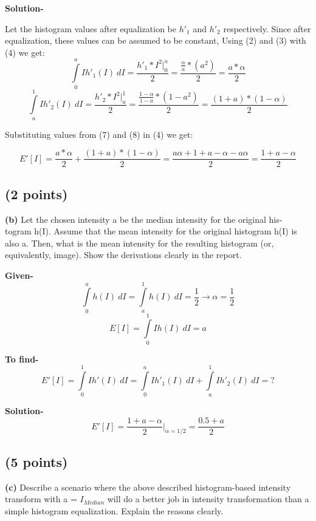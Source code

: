 \documentclass{article}
\begin{document}
\textbf{Solution-}

Let the histogram values after equalization be $h'_1$ and $h'_2$ respectively. Since after equalization, these values can be assumed to be constant,
Using (2) and (3) with (4) we get:
\begin{equation} \int\limits_0^a I h'_1(I) \ dI =\frac{h'_1 * I^2|_0^a}{2}=\frac{\frac{\alpha}{a}*(a^2)}{2}  = \frac{a*\alpha}{2}\end{equation}
\begin{equation} \int\limits_a^1 I h'_2(I) \ dI =\frac{h'_2 * I^2|_a^1}{2}=\frac{\frac{1-\alpha}{1-a}*(1-a^2)}{2}= \frac{(1+a)*(1-\alpha)}{2}\end{equation}

Substituting values from (7) and (8) in (4) we get:

\begin{equation}E'[I] = \frac{a*\alpha}{2}+\frac{(1+a)*(1-\alpha)}{2}=\frac{a\alpha+1+a-\alpha-a\alpha}{2}=\frac{1+a-\alpha}{2}\end{equation}
\subsection{(2 points)}
\textbf{(b)} Let the chosen intensity a be the median intensity for the original his-
togram h(I). Assume that the mean intensity for the original histogram h(I)
is also a. Then, what is the mean intensity for the resulting histogram (or,
equivalently, image). Show the derivations clearly in the report.

\textbf{Given-}
\begin{equation}\int\limits_0^a h(I) \ dI =\int\limits_a^1 h(I) \ dI = \frac{1}{2} \rightarrow \alpha = \frac{1}{2}\end{equation}
\begin{equation}E[I] = \int\limits_0^1 I h(I) \ dI =a\end{equation}

\textbf{To find-}
\begin{equation}E'[I] = \int\limits_0^1 I h'(I) \ dI = \int\limits_0^a I h'_1(I) \ dI + \int\limits_a^1 Ih'_2(I) \ dI = ?\end{equation}

\textbf{Solution-}
\begin{equation}E'[I] = \frac{1+a-\alpha}{2}|_{\alpha=1/2} = \frac{0.5+a}{2}\end{equation}

\subsection{(5 points)}
\textbf{(c)} Describe a scenario where the above described histogram-based intensity
transform with a = $I_{Median}$ will do a better job in intensity transformation
than a simple histogram equalization. Explain the reasons clearly.
\end{document}
